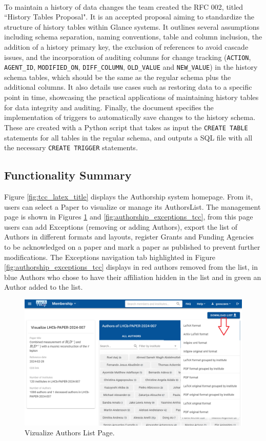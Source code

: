 \paragraph{} To maintain a history of data changes the team created the RFC 002, titled ``History Tables Proposal". It is an accepted proposal aiming to standardize the structure of history tables within Glance systems. It outlines several assumptions including schema separation, naming conventions, table and column inclusion, the addition of a history primary key, the exclusion of references to avoid cascade issues, and the incorporation of auditing columns for change tracking (\verb|ACTION|, \verb|AGENT_ID|, \verb|MODIFIED_ON|, \verb|DIFF_COLUMN|, \verb|OLD_VALUE| and \verb|NEW_VALUE|) in the history schema tables, which should be the same as the regular schema plus the additional columns. It also details use cases such as restoring data to a specific point in time, showcasing the practical applications of maintaining history tables for data integrity and auditing. Finally, the document specifies the implementation of triggers to automatically save changes to the history schema. These are created with a Python script that takes as input the \verb|CREATE TABLE| statements for all tables in the regular schema, and outputs a SQL file with all the necessary \verb|CREATE TRIGGER| statements.

\subsection{Functionality Summary}
Figure \ref{fig:tcc_latex_title} displays the Authorship system homepage. From it, users can select a Paper to visualize or manage its AuthorsList. The management page is shown in Figures \ref{fig:manager_paper_view_tcc} and \ref{fig:authorship_exceptions_tcc}, from this page users can add Exceptions (removing or adding Authors), export the list of Authors in different formats and layouts, register Grants and Funding Agencies to be acknowledged on a paper and mark a paper as published to prevent further modifications. The Exceptions navigation tab highlighted in Figure \ref{fig:authorship_exceptions_tcc} displays in red authors removed from the list, in blue Authors who chose to have their affiliation hidden in the list and in green an Author added to the list.

\begin{figure}[H]
    \centering
    \includegraphics[width=0.8\linewidth]{figuras/manager_paper_view_tcc.png}
    \caption{Vizualize Authors List Page.}
    \label{fig:manager_paper_view_tcc}
\end{figure}

